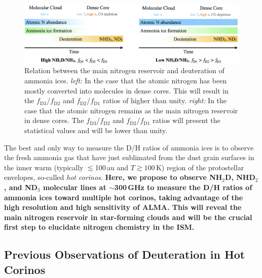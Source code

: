 \documentclass[12pt,a4paper]{article}  %
\begin{document}
\begin{figure}[th]
    \centering
    \includegraphics[width=\textwidth]{ammonia_deuteration_cartoon_no_schemfig_ver2.png}
    \caption{Relation between the main nitrogen reservoir and deuteration of ammonia ices. \textit{left:} In the case that the atomic nitrogen has been mostly converted into molecules in dense cores. This will result in the $f_\mathrm{D3}$/$f_\mathrm{D2}$ and $f_\mathrm{D2}$/$f_\mathrm{D1}$ ratios of higher than unity. \textit{right:} In the case that the atomic nitrogen remains as the main nitrogen reservoir in dense cores. The $f_\mathrm{D3}$/$f_\mathrm{D2}$ and $f_\mathrm{D2}$/$f_\mathrm{D1}$ ratios will present the statistical values and will be lower than unity.}
    \label{fig:ammonia_deuteration}
\end{figure}

\smallskip
\noindent The best and only way to measure the D/H ratios of ammonia ices is to observe the fresh ammonia gas that have just sublimated from the dust grain surfaces in the inner warm (typically $\lesssim$100\,au and $T\gtrsim100$\,K) region of the protostellar envelopes, so-called \textit{hot corinos}. \textbf{Here, we propose to observe NH$_2$D, NHD$_2$, and ND$_3$ molecular lines at $\sim$300\,GHz to measure the D/H ratios of ammonia ices toward multiple hot corinos, taking advantage of the high resolution and high sensitivity of ALMA. This will reveal the main nitrogen reservoir in star-forming clouds and will be the crucial first step to elucidate nitrogen chemistry in the ISM.}

\subsection{Previous Observations of Deuteration in Hot Corinos}

\end{document}
